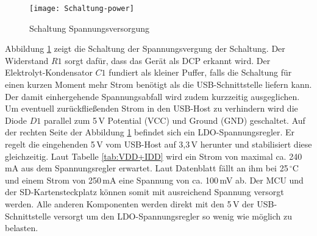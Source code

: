 \begin{figure}[h]
	\begin{center}
		\texttt{[image: Schaltung-power]}	
		\caption{Schaltung Spannungsversorgung}
		\label{fig:Schaltung-power}
	\end{center}
\end{figure}
Abbildung \ref{fig:Schaltung-power} zeigt die Schaltung der Spannungsvergung der Schaltung. Der Widerstand $R1$ sorgt dafür, dass das Gerät als DCP erkannt wird. Der Elektrolyt-Kondensator $C1$ fundiert als kleiner Puffer, falls die Schaltung für einen kurzen Moment mehr Strom benötigt als die USB-Schnittstelle liefern kann. Der damit einhergehende Spannungsabfall wird zudem kurzzeitig ausgeglichen. Um eventuell zurückfließenden Strom in den USB-Host zu verhindern wird die Diode $D1$ parallel zum 5\,V Potential (VCC) und Ground (GND) geschaltet. Auf der rechten Seite der Abbildung \ref{fig:Schaltung-power} befindet sich ein LDO-Spannungsregler. Er regelt die eingehenden 5\,V vom USB-Host auf 3,3\,V herunter und stabilisiert diese gleichzeitig. Laut Tabelle \ref{tab:VDD+IDD} wird ein Strom von maximal ca. 240\,mA aus dem Spannungsregler erwartet. Laut Datenblatt fällt an ihm bei 25\,$^{\circ}$C und einem Strom von 250\,mA eine Spannung von ca. 100\,mV ab. Der MCU und der SD-Kartensteckplatz können somit mit ausreichend Spannung versorgt werden. Alle anderen Komponenten werden direkt mit den 5\,V der USB-Schnittstelle versorgt um den LDO-Spannungsregler so wenig wie möglich zu belasten.